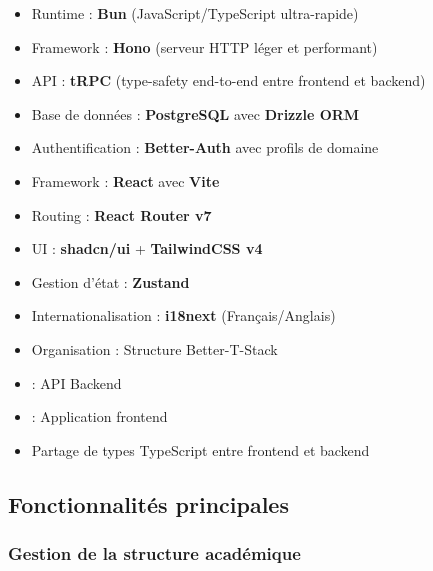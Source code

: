 \begin{description}[leftmargin=3cm, style=nextline]
    \item[Backend API]
    \begin{itemize}
        \item Runtime : \textbf{Bun} (JavaScript/TypeScript ultra-rapide)
        \item Framework : \textbf{Hono} (serveur HTTP léger et performant)
        \item API : \textbf{tRPC} (type-safety end-to-end entre frontend et backend)
        \item Base de données : \textbf{PostgreSQL} avec \textbf{Drizzle ORM}
        \item Authentification : \textbf{Better-Auth} avec profils de domaine
    \end{itemize}

    \item[Frontend Web]
    \begin{itemize}
        \item Framework : \textbf{React} avec \textbf{Vite}
        \item Routing : \textbf{React Router v7}
        \item UI : \textbf{shadcn/ui} + \textbf{TailwindCSS v4}
        \item Gestion d'état : \textbf{Zustand}
        \item Internationalisation : \textbf{i18next} (Français/Anglais)
    \end{itemize}

    \item[Architecture Monorepo]
    \begin{itemize}
        \item Organisation : Structure Better-T-Stack
        \item {} : API Backend
        \item {} : Application frontend
        \item Partage de types TypeScript entre frontend et backend
    \end{itemize}
\end{description}

\subsection{Fonctionnalités principales}

\subsubsection{Gestion de la structure académique}

